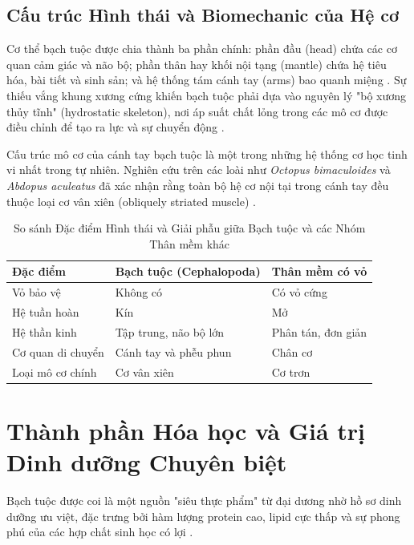\documentclass[12pt,a4paper]{report}
\begin{document}
\subsection{Cấu trúc Hình thái và Biomechanic của Hệ cơ}

Cơ thể bạch tuộc được chia thành ba phần chính: phần đầu (head) chứa các cơ quan cảm giác và não bộ; phần thân hay khối nội tạng (mantle) chứa hệ tiêu hóa, bài tiết và sinh sản; và hệ thống tám cánh tay (arms) bao quanh miệng \cite{ck12_mollusca}. Sự thiếu vắng khung xương cứng khiến bạch tuộc phải dựa vào nguyên lý "bộ xương thủy tĩnh" (hydrostatic skeleton), nơi áp suất chất lỏng trong các mô cơ được điều chỉnh để tạo ra lực và sự chuyển động \cite{wgnhs_cephalopod}.

Cấu trúc mô cơ của cánh tay bạch tuộc là một trong những hệ thống cơ học tinh vi nhất trong tự nhiên. Nghiên cứu trên các loài như \textit{Octopus bimaculoides} và \textit{Abdopus aculeatus} đã xác nhận rằng toàn bộ hệ cơ nội tại trong cánh tay đều thuộc loại cơ vân xiên (obliquely striated muscle) \cite{pmc_musculature}.

\begin{table}[H]
\centering
\caption{So sánh Đặc điểm Hình thái và Giải phẫu giữa Bạch tuộc và các Nhóm Thân mềm khác}
\begin{tabular}{p{3.5cm} p{5.5cm} p{5.5cm}}
\toprule
\textbf{Đặc điểm} & \textbf{Bạch tuộc (Cephalopoda)} & \textbf{Thân mềm có vỏ} \\
\midrule
Vỏ bảo vệ & Không có & Có vỏ cứng \\
Hệ tuần hoàn & Kín & Mở \\
Hệ thần kinh & Tập trung, não bộ lớn & Phân tán, đơn giản \\
Cơ quan di chuyển & Cánh tay và phễu phun & Chân cơ \\
Loại mô cơ chính & Cơ vân xiên & Cơ trơn \\
\bottomrule
\end{tabular}
\end{table}

\section{Thành phần Hóa học và Giá trị Dinh dưỡng Chuyên biệt}

Bạch tuộc được coi là một nguồn "siêu thực phẩm" từ đại dương nhờ hồ sơ dinh dưỡng ưu việt, đặc trưng bởi hàm lượng protein cao, lipid cực thấp và sự phong phú của các hợp chất sinh học có lợi \cite{mdpi_algarve}.
\end{document}
